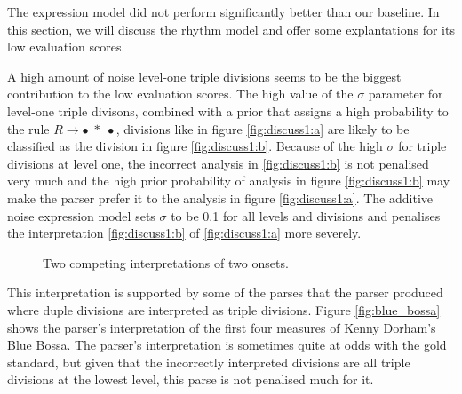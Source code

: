 The expression model did not perform significantly better than our baseline. In this section, we will discuss the rhythm model and offer some explantations for its low evaluation scores.


A high amount of noise level-one triple divisions seems to be the biggest contribution to the low evaluation scores. The high value of the $\sigma$ parameter for level-one triple divisons, combined with a prior that assigns a high probability to the rule $R \rightarrow \bullet\; *\; \bullet$, divisions like in figure \ref{fig:discuss1:a} are likely to be classified as the division in figure \ref{fig:discuss1:b}. Because of the high $\sigma$ for triple divisions at level one, the incorrect analysis in \ref{fig:discuss1:b} is not penalised very much and the high prior probability of analysis in figure \ref{fig:discuss1:b} may make the parser prefer it to the analysis in figure \ref{fig:discuss1:a}. The additive noise expression model sets $\sigma$ to be 0.1 for all levels and divisions and penalises the interpretation \ref{fig:discuss1:b} of \ref{fig:discuss1:a} more severely.

\begin{figure}
\centering
{}
\caption{Two competing interpretations of two onsets.}
\label{fig:discuss1}
\end{figure}

This interpretation is supported by some of the parses that the parser produced where duple divisions are interpreted as triple divisions. Figure \ref{fig:blue_bossa} shows the parser's interpretation of the first four measures of Kenny Dorham's Blue Bossa. The parser's interpretation is sometimes quite at odds with the gold standard, but given that the incorrectly interpreted divisions are all triple divisions at the lowest level, this parse is not penalised much for it.


